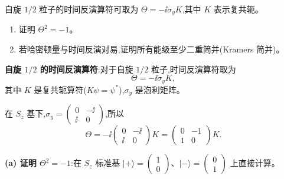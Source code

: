 \begin{question}
自旋 $1/2$ 粒子的时间反演算符可取为 $\Theta=-\ii\sigma_yK$,其中 $K$ 表示复共轭。
\begin{enumerate}
\item 证明 $\Theta^2=-1$。
\item 若哈密顿量与时间反演对易,证明所有能级至少二重简并(Kramers 简并)。
\end{enumerate}
\begin{solution}
	\textbf{自旋 $1/2$ 的时间反演算符}:对于自旋 $1/2$ 粒子,时间反演算符取为
	\[
	\Theta = -\ii\sigma_y K,
	\]
	其中 $K$ 是复共轭算符($K\psi=\psi^*$),$\sigma_y$ 是泡利矩阵。

	在 $S_z$ 基下,$\sigma_y = \begin{pmatrix}0&-\ii\\\ii&0\end{pmatrix}$,所以
	\[
	\Theta = -\ii\begin{pmatrix}0&-\ii\\\ii&0\end{pmatrix}K
	= \begin{pmatrix}0&-1\\1&0\end{pmatrix}K.
	\]

	\textbf{(a) 证明 $\Theta^2 = -1$}:在 $S_z$ 标准基 $|+\rangle=\begin{pmatrix}1\\0\end{pmatrix}$、$|-\rangle=\begin{pmatrix}0\\1\end{pmatrix}$ 上直接计算。


\end{solution}
\end{question}
